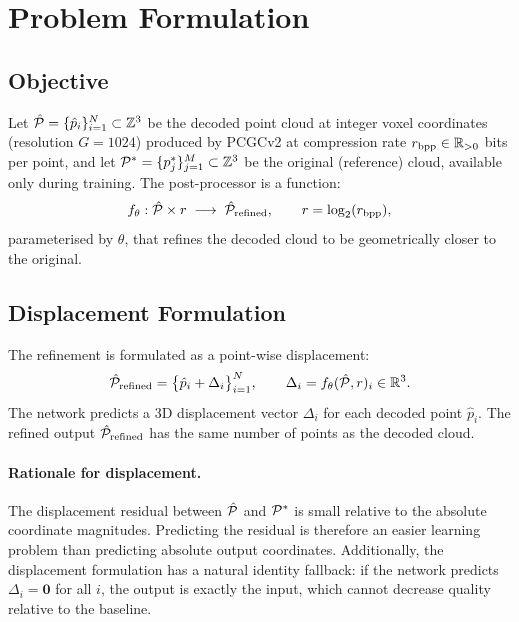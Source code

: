 \section{Problem Formulation}
\label{sec:formulation}

\subsection{Objective}

Let $\hat{\mathcal{P}} = \{\hat{p}_i\}_{i=1}^{N} \subset \mathbb{Z}^3$ be the
decoded point cloud at integer voxel coordinates (resolution $G = 1024$)
produced by PCGCv2 at compression rate $r_{\mathrm{bpp}} \in \mathbb{R}_{>0}$ bits per point,
and let $\mathcal{P}^* = \{p^*_j\}_{j=1}^{M} \subset \mathbb{Z}^3$ be the original
(reference) cloud, available only during training.
The post-processor is a function:
\begin{equation}
  f_\theta : \hat{\mathcal{P}} \times r \;\longrightarrow\; \hat{\mathcal{P}}_{\text{refined}},
  \qquad r = \log_2(r_{\mathrm{bpp}}),
\end{equation}
parameterised by $\theta$, that refines the decoded cloud to be geometrically
closer to the original.

\subsection{Displacement Formulation}

The refinement is formulated as a point-wise displacement:
\begin{equation}
  \hat{\mathcal{P}}_{\text{refined}} = \bigl\{\hat{p}_i + \Delta_i\bigr\}_{i=1}^{N},
  \qquad \Delta_i = f_\theta(\hat{\mathcal{P}}, r)_i \in \mathbb{R}^3.
\end{equation}
The network predicts a 3D displacement vector $\Delta_i$ for each decoded
point $\hat{p}_i$.
The refined output $\hat{\mathcal{P}}_{\text{refined}}$ has the same number of points
as the decoded cloud.

\paragraph{Rationale for displacement.}
The displacement residual between $\hat{\mathcal{P}}$ and $\mathcal{P}^*$ is small relative
to the absolute coordinate magnitudes.
Predicting the residual is therefore an easier learning problem than predicting
absolute output coordinates.
Additionally, the displacement formulation has a natural identity fallback:
if the network predicts $\Delta_i = \mathbf{0}$ for all $i$, the output
is exactly the input, which cannot decrease quality relative to the baseline.

